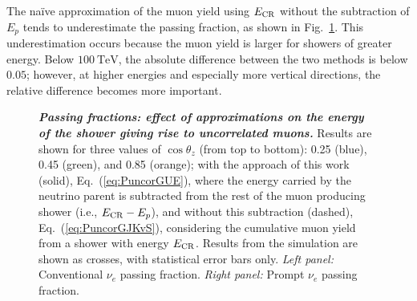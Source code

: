 The na\"ive approximation of the muon yield using $E_{\rm CR}$ without the subtraction of $E_p$ tends to underestimate the passing fraction, as shown in Fig.~\ref{fig:nue_passing-double-counting}.
This underestimation occurs because the muon yield is larger for showers of greater energy.
Below $\SI{100}\TeV$, the absolute difference between the two methods is below $0.05$; however, at higher energies and especially more vertical directions, the relative difference becomes more important.

\begin{figure}
	\centering
	\caption{\textbf{\textit{Passing fractions: effect of approximations on the energy of the shower giving rise to uncorrelated muons.}} Results are shown for three values of $\cos\theta_z$ (from top to bottom): 0.25 (blue), 0.45 (green), and 0.85 (orange); with the approach of this work (solid), Eq.~(\ref{eq:PuncorGUE}), where the energy carried by the neutrino parent is subtracted from the rest of the muon producing shower (i.e., $E_{\rm CR} - E_p$), and without this subtraction (dashed), Eq.~(\ref{eq:PuncorGJKvS}), considering the cumulative muon yield from a shower with energy $E_{\rm CR}$. Results from the \CORSIKA{} simulation are shown as crosses, with statistical error bars only. \textit{Left panel:} Conventional $\nu_e$ passing fraction. \textit{Right panel:} Prompt $\nu_e$ passing fraction.
	}
	\label{fig:nue_passing-double-counting}
\end{figure}

